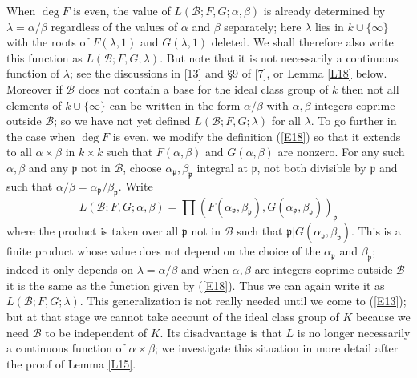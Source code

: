 \documentclass[12pt]{article}
\def\fp{{\mathfrak p}}
\def\ga{{\alpha}}
\def\gb{{\beta}}
\def\gl{{\lambda}}
\def\sB{{\mathcal B}}
\def\beq{\begin{equation} \label}
\begin{document}
When $\deg F$ is even, the value of $L(\sB;F,G;\ga,\gb)$ is already
determined by $\gl=\ga/\gb$ regardless of the values
of $\ga$ and $\gb$ separately; here $\gl$ lies in
$k\cup\{\infty\}$ with the roots of $F(\gl,1)$ and $G(\gl,1)$ deleted. We shall
therefore also write this function as $L(\sB;F,G;\gl)$. But note that
it is not necessarily a continuous function of $\gl$; see the discussions in
[13] and \S9 of [7], or Lemma \ref{L18} below. Moreover if $\sB$ does not
contain a base for the ideal class group of $k$ then not all
elements of $k\cup\{\infty\}$ can be written in the form $\ga/\gb$
with $\ga,\gb$ integers coprime outside $\sB$; so we have not yet defined
$L(\sB;F,G;\gl)$ for all $\gl$. To go further in the case when
$\deg F$ is even,
we modify the definition (\ref{E18}) so that it extends to all $\ga\times\gb$
in $k\times k$ such that $F(\ga,\gb)$ and $G(\ga,\gb)$ are nonzero. For any
such $\ga,\gb$ and any $\fp$ not in $\sB$, choose $\ga_\fp,\gb_\fp$ integral
at $\fp$,
not both divisible by $\fp$ and such that $\ga/\gb=\ga_\fp/\gb_\fp$. Write
\beq{E52} L(\sB;F,G;\ga,\gb)=
\prod(F(\ga_\fp,\gb_\fp),G(\ga_\fp,\gb_\fp))_\fp \end{equation}
where the product is taken over all $\fp$ not in $\sB$ such that
$\fp|G(\ga_\fp,\gb_\fp)$. This is a finite product whose value does not depend
on the choice of the $\ga_\fp$ and $\gb_\fp$; indeed it only depends on
$\gl=\ga/\gb$ and when $\ga,\gb$ are integers coprime outside $\sB$ it is the
same as the function given by (\ref{E18}). Thus we can again write it as
$L(\sB;F,G;\gl)$. This generalization is not really
needed until we come to (\ref{E13}); but at that stage we
cannot take account of the ideal class group of $K$ because
we need $\sB$
to be independent of $K$. Its disadvantage is that $L$ is no longer
necessarily a continuous function of $\ga\times\gb$; we investigate this
situation in more detail after the proof of Lemma \ref{L15}.
\end{document}
